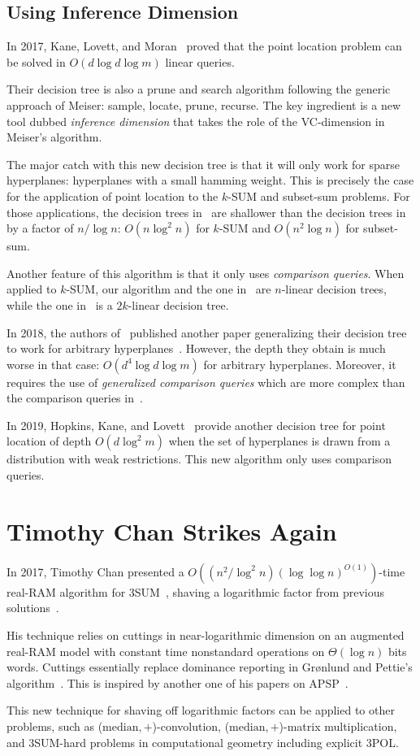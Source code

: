 \subsection{Using Inference Dimension}

In 2017, Kane, Lovett, and Moran~\cite{KLM18} proved that the point location
problem can be solved in \(O(d \log d \log m)\) linear queries.

Their decision tree is also a prune and search algorithm following
the generic approach of Meiser: sample, locate,
prune, recurse. The key ingredient is a new tool dubbed \emph{inference
dimension} that takes the role of the VC-dimension in Meiser's algorithm.

The major catch with this new decision tree is that it will only work for
sparse hyperplanes: hyperplanes with a small hamming weight. This is precisely
the case for the application of point location to the \(k\)-SUM and subset-sum
problems. For those applications, the decision trees in~\cite{KLM18} are shallower than the
decision trees in~\cite{ES17} by a factor of $n / \log n$:
$O(n \log^2 n)$ for \(k\)-SUM and \(O(n^2 \log n)\) for subset-sum.

Another feature of this algorithm is that it only uses \emph{comparison
queries}. When applied to \(k\)-SUM, our algorithm and the one in~\cite{ES17} are \(n\)-linear
decision trees, while the one in~\cite{KLM18} is a \(2k\)-linear decision tree.

In 2018, the authors of~\cite{KLM18} published another paper generalizing their
decision tree to work for arbitrary hyperplanes~\cite{KLM18b}. However,
the depth they obtain is much worse in that case: $O(d^4 \log d \log m)$ for
arbitrary hyperplanes. Moreover, it requires the use of \emph{generalized
comparison queries} which are more complex than the comparison queries
in~\cite{KLM18}.

In 2019,  Hopkins, Kane, and Lovett~\cite{HKL19} provide another decision
tree for point location of depth \(O(d \log^2 m)\) when the set of
hyperplanes is drawn from a distribution with weak restrictions. This new
algorithm only uses comparison queries.

\section{Timothy Chan Strikes Again}

In 2017, Timothy Chan presented a
\(O((n^2 / \log^2 n)(\log \log n)^{O(1)})\)-time real-RAM algorithm for
3SUM~\cite{Ch18}, shaving a logarithmic factor from previous solutions~\cite{Fr15,GS15}.

His technique relies on cuttings in near-logarithmic dimension on an augmented
real-RAM model with constant time nonstandard operations on $\Theta(\log n)$
bits words. Cuttings essentially replace dominance reporting in Gr\o nlund and
Pettie's algorithm~\cite{GP18}.
This is inspired by another one of his papers on APSP~\cite{Cha10}.

This new technique for shaving off logarithmic factors
can be applied to other problems, such as (\(\text{median}, +\))-convolution,
(\(\text{median}, +\))-matrix multiplication, and 3SUM-hard problems in
computational geometry including explicit 3POL.
